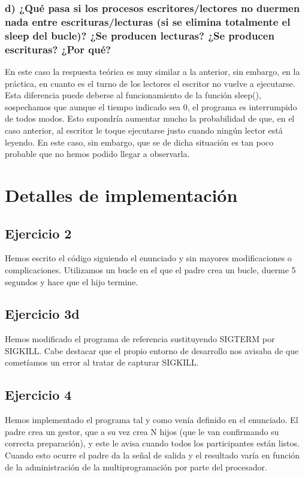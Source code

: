 \documentclass[]{article}
\begin{document}
\subsubsection*{d) ¿Qué pasa si los procesos escritores/lectores no duermen nada entre escrituras/lecturas (si se elimina totalmente el sleep del bucle)? ¿Se producen lecturas? ¿Se producen escrituras? ¿Por qué?}
En este caso la respuesta teórica es muy similar a la anterior, sin embargo, en la práctica, en cuanto es el turno de  los lectores el escritor no vuelve a ejecutarse. \\

Esta diferencia puede deberse al funcionamiento de la función sleep(), sospechamos que aunque el tiempo indicado sea 0, el programa es interrumpido de todos modos. Esto supondría aumentar mucho la probabilidad de que, en el caso anterior, al escritor le toque ejecutarse justo cuando ningún lector está leyendo. En este caso, sin embargo, que se de dicha situación es tan poco probable que no hemos podido llegar a observarla.

\section*{Detalles de implementación}
\subsection*{Ejercicio 2}
Hemos escrito el código siguiendo el enunciado y sin mayores modificaciones o complicaciones. Utilizamos un bucle en el que el padre crea un bucle, duerme 5 segundos y hace que el hijo termine.

\subsection*{Ejercicio 3d}
Hemos modificado el programa de referencia sustituyendo SIGTERM por SIGKILL. Cabe destacar que el propio entorno de desarrollo nos avisaba de que cometíamos un error al tratar de capturar SIGKILL.

\subsection*{Ejercicio 4}
Hemos implementado el programa tal y como venía definido en el enunciado. El padre crea un gestor, que a su vez crea N hijos (que le van confirmando su correcta preparación), y este le avisa cuando todos los participantes están listos. Cuando esto ocurre el padre da la señal de salida y el resultado varía en función de la administración de la multiprogramación por parte del procesador. \\
\end{document}
